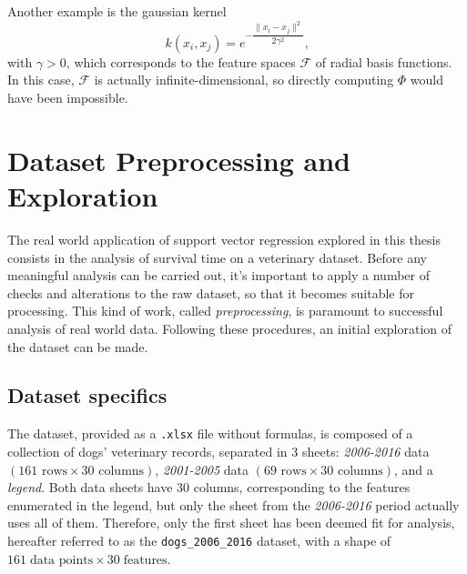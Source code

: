 \documentclass[12pt]{report}
\begin{document}
Another example is the gaussian kernel
\begin{equation} \label{gausskernel}
k(x_{i},x_{j}) = e^{-\dfrac{\| x_{i}-x_{j} \|^{2}}{2\gamma^{2}}} \text{,}
\end{equation}
with $ \gamma > 0 $, which corresponds to the feature spaces $ \mathcal{F} $ of radial basis functions. In this case, $ \mathcal{F} $ is actually infinite-dimensional, so directly computing $ \Phi $ would have been impossible.

\chapter{Dataset Preprocessing and Exploration}
\label{chprepr}
The real world application of support vector regression explored in this thesis consists in the analysis of survival time on a veterinary dataset. Before any meaningful analysis can be carried out, it's important to apply a number of checks and alterations to the raw dataset, so that it becomes suitable for processing. This kind of work, called \textit{preprocessing}, is paramount to successful analysis of real world data. Following these procedures, an initial exploration of the dataset can be made.

\section{Dataset specifics}
The dataset, provided as a \texttt{.xlsx} file without formulas, is composed of a collection of dogs' veterinary records, separated in 3 sheets: \textit{2006-2016} data $ (161 \text{ rows} \times 30 \text{ columns}) $, \textit{2001-2005} data $ (69 \text{ rows} \times 30 \text{ columns}) $, and a \textit{legend}. Both data sheets have 30 columns, corresponding to the features enumerated in the legend, but only the sheet from the \textit{2006-2016} period actually uses all of them. Therefore, only the first sheet has been deemed fit for analysis, hereafter referred to as the \texttt{dogs\_2006\_2016} dataset, with a shape of $ 161\; \text{data points} \times 30\; \text{features} $.
\end{document}
